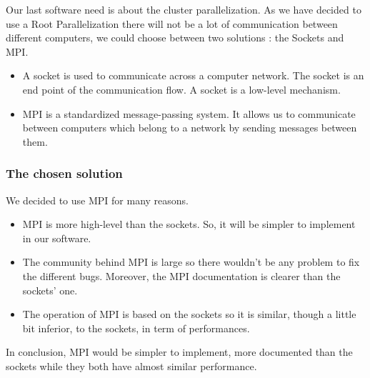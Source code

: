 Our last software need is about the cluster parallelization. As we have decided to use a Root Parallelization there will not be a lot of communication between different computers, we could choose between two solutions : the Sockets and MPI.
\begin{itemize}
\item A socket is used to communicate across a computer network. The socket is an end point of the communication flow. A socket is a low-level mechanism.
\item MPI is a standardized message-passing system. It allows us to communicate between computers which belong to a network by sending messages between them. 
\end{itemize}
\subsubsection{The chosen solution}

We decided to use MPI for many reasons.
\begin{itemize}
\item MPI is more high-level than the sockets. So, it will be simpler to implement in our software.
\item The community behind MPI is large so there wouldn't be any problem to fix the different bugs. Moreover, the MPI documentation is clearer than the sockets' one. 
\item The operation of MPI is based on the sockets so it is similar, though a little bit inferior, to the sockets, in term of performances.
\end{itemize}
In conclusion, MPI would be simpler to implement, more documented than the sockets while they both have almost similar performance.